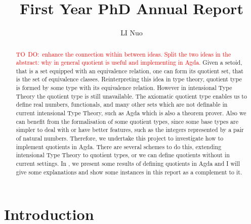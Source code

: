 \documentclass[envcountsame]{llncs}
\author{LI Nuo}
\title{First Year PhD Annual Report}
\institute{University of Nottingham}
\newcommand{\todo}[1]{\textcolor{red}{TO~DO:~#1}}
\newcommand{\itt}{intensional Type Theory}
\begin{document}
\maketitle

\newpage

\tableofcontents

\newpage 

\begin{abstract}
\todo{enhance the connection within between ideas. Split the two ideas in the abstract: why in general quotient is useful and implementing in Agda.}
Given a setoid, that is a set equipped with an equivalence relation, one can form its quotient set, that is the set of equivalence classes. %
Reinterpreting this idea in type theory, quotient type is formed by some type with its equivalence relation. However in \itt{}  the quotient type is still unavailable. The axiomatic quotient type enables us to define real numbers, functionals, and many other sets which are not definable in current \itt,  such as Agda which is also a theorem prover. Also we can benefit from the formalisation of some quotient types, since some base types are simpler to deal with or have better features, such as the integers represented by a pair of natural numbers.  Therefore, we undertake this project to investigate how to implement quotients in Agda. There are several schemes to do this, extending intensional Type Theory to quotient types, or we can define quotients without in current settings. In  \cite{aan}, we present some results of defining quotients in Agda and I will
give some explanations  and show some instances in this report as a complement to it.

\end{abstract}


\section{Introduction}
\end{document}
